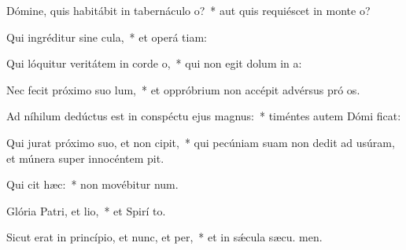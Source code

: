 \item Dómine, quis habitábit in tabernáculo o?~* aut quis requiéscet in monte  o?
\item Qui ingréditur sine cula,~* et operá tiam:
\item Qui lóquitur veritátem in corde o,~* qui non egit dolum in  a:
\item Nec fecit próximo suo lum,~* et oppróbrium non accépit advérsus pró os.
\item Ad níhilum dedúctus est in conspéctu ejus magnus:~* timéntes autem Dómi ficat:
\item Qui jurat próximo suo, et non cipit,~* qui pecúniam suam non dedit ad usúram, et múnera super innocéntem  pit.
\item Qui cit hæc:~* non movébitur  num.
\item Glória Patri, et lio,~* et Spirí to.
\item Sicut erat in princípio, et nunc, et per,~* et in sǽcula sæcu. men.
